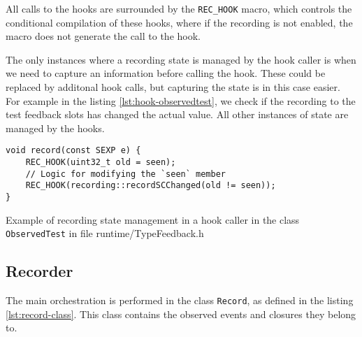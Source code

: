 All calls to the hooks are surrounded by the \texttt{REC\_HOOK} macro, which controls the conditional compilation of these hooks, where if the recording is not enabled, the macro does not generate the call to the hook.

The only instances where a recording state is managed by the hook caller is when we need to capture an information before calling the hook. These could be replaced by additonal hook calls, but capturing the state is in this case easier. For example in the listing \ref{lst:hook-observedtest}, we check if the recording to the test feedback slots has changed the actual value. All other instances of state are managed by the hooks.

\begin{listing}
	\centering
	\begin{verbatim}
void record(const SEXP e) {
    REC_HOOK(uint32_t old = seen);
    // Logic for modifying the `seen` member
    REC_HOOK(recording::recordSCChanged(old != seen));
}
  \end{verbatim}
	\caption{Example of recording state management in a hook caller in the class \texttt{ObservedTest} in file runtime/TypeFeedback.h}\label{lst:hook-observedtest}
\end{listing}

\subsection{Recorder}

The main orchestration is performed in the class \texttt{Record}, as defined in the listing \ref{lst:record-class}. This class contains the observed events and closures they belong to.

